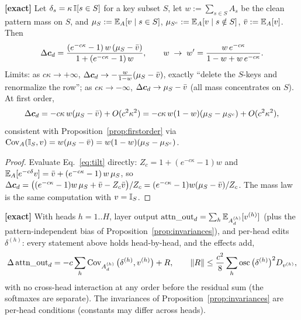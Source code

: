 \documentclass{article}
\begin{document}
\begin{prop}\label{prop:twovalued}
\textbf{[exact]} Let $\delta_s = \kappa\,\mathbb{I}[s \in S]$ for a key subset $S$, let $w := \sum_{s\in S} A_s$ be the clean pattern mass on $S$, and $\mu_S := \mathbb{E}_A[v \mid s \in S]$, $\mu_{S^c} := \mathbb{E}_A[v \mid s \notin S]$, $\bar v := \mathbb{E}_A[v]$. Then
\begin{equation}\label{eq:twovalued}
    \Delta\boldsymbol{c}_d = \frac{(e^{-c\kappa}-1)\, w\,(\mu_S - \bar v)}{1 + (e^{-c\kappa}-1)\,w},
    \qquad
    w \;\to\; w' = \frac{w\, e^{-c\kappa}}{1 - w + w\, e^{-c\kappa}} .
\end{equation}
Limits: as $c\kappa \to +\infty$, $\Delta\boldsymbol{c}_d \to -\tfrac{w}{1-w}(\mu_S - \bar v)$, exactly ``delete the $S$-keys and renormalize the row''; as $c\kappa \to -\infty$, $\Delta\boldsymbol{c}_d \to \mu_S - \bar v$ (all mass concentrates on $S$). At first order,
\begin{equation}
    \Delta\boldsymbol{c}_d = -c\kappa\, w(\mu_S - \bar v) + O(c^2\kappa^2)
    = -c\kappa\, w(1-w)(\mu_S - \mu_{S^c}) + O(c^2\kappa^2),
\end{equation}
consistent with Proposition~\ref{prop:firstorder} via $\operatorname{Cov}_A(\mathbb{I}_S, v) = w(\mu_S - \bar v) = w(1-w)(\mu_S - \mu_{S^c})$.
\end{prop}
\begin{proof}
Evaluate Eq.~\eqref{eq:tilt} directly: $Z_c = 1 + (e^{-c\kappa}-1)w$ and $\mathbb{E}_A[e^{-c\delta}v] = \bar v + (e^{-c\kappa}-1)\,w\,\mu_S$, so $\Delta\boldsymbol{c}_d = \big((e^{-c\kappa}-1)w\,\mu_S + \bar v - Z_c\bar v\big)/Z_c = (e^{-c\kappa}-1)w(\mu_S - \bar v)/Z_c$. The mass law is the same computation with $v = \mathbb{I}_S$.
\end{proof}

\begin{prop}\label{prop:multihead}
\textbf{[exact]} With heads $h = 1..H$, layer output $\mathrm{attn\_out}_d = \sum_h \mathbb{E}_{A^{(h)}_d}[v^{(h)}]$ (plus the pattern-independent bias of Proposition~\ref{prop:invariances}), and per-head edits $\delta^{(h)}$: every statement above holds head-by-head, and the effects add,
\begin{equation}
    \Delta\,\mathrm{attn\_out}_d = -c\sum_h \operatorname{Cov}_{A^{(h)}_d}\big(\delta^{(h)}, v^{(h)}\big) + R,
    \qquad
    \|R\| \le \frac{c^2}{8}\sum_h \operatorname{osc}\big(\delta^{(h)}\big)^2 D_{v^{(h)}} ,
\end{equation}
with no cross-head interaction at any order before the residual sum (the softmaxes are separate). The invariances of Proposition~\ref{prop:invariances} are per-head conditions (constants may differ across heads).
\end{prop}
\end{document}
